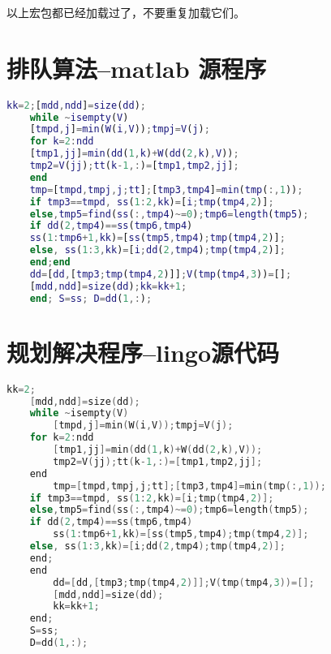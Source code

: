 \begin{appendices}
    以上宏包都已经加载过了，不要重复加载它们。
    
    \section{排队算法--matlab 源程序}
    
    \begin{lstlisting}[language=matlab]
    kk=2;[mdd,ndd]=size(dd);
    while ~isempty(V)
    [tmpd,j]=min(W(i,V));tmpj=V(j);
    for k=2:ndd
    [tmp1,jj]=min(dd(1,k)+W(dd(2,k),V));
    tmp2=V(jj);tt(k-1,:)=[tmp1,tmp2,jj];
    end
    tmp=[tmpd,tmpj,j;tt];[tmp3,tmp4]=min(tmp(:,1));
    if tmp3==tmpd, ss(1:2,kk)=[i;tmp(tmp4,2)];
    else,tmp5=find(ss(:,tmp4)~=0);tmp6=length(tmp5);
    if dd(2,tmp4)==ss(tmp6,tmp4)
    ss(1:tmp6+1,kk)=[ss(tmp5,tmp4);tmp(tmp4,2)];
    else, ss(1:3,kk)=[i;dd(2,tmp4);tmp(tmp4,2)];
    end;end
    dd=[dd,[tmp3;tmp(tmp4,2)]];V(tmp(tmp4,3))=[];
    [mdd,ndd]=size(dd);kk=kk+1;
    end; S=ss; D=dd(1,:);
     \end{lstlisting}
    
     \section{规划解决程序--lingo源代码}
    
    \begin{lstlisting}[language=c]
    kk=2;
    [mdd,ndd]=size(dd);
    while ~isempty(V)
        [tmpd,j]=min(W(i,V));tmpj=V(j);
    for k=2:ndd
        [tmp1,jj]=min(dd(1,k)+W(dd(2,k),V));
        tmp2=V(jj);tt(k-1,:)=[tmp1,tmp2,jj];
    end
        tmp=[tmpd,tmpj,j;tt];[tmp3,tmp4]=min(tmp(:,1));
    if tmp3==tmpd, ss(1:2,kk)=[i;tmp(tmp4,2)];
    else,tmp5=find(ss(:,tmp4)~=0);tmp6=length(tmp5);
    if dd(2,tmp4)==ss(tmp6,tmp4)
        ss(1:tmp6+1,kk)=[ss(tmp5,tmp4);tmp(tmp4,2)];
    else, ss(1:3,kk)=[i;dd(2,tmp4);tmp(tmp4,2)];
    end;
    end
        dd=[dd,[tmp3;tmp(tmp4,2)]];V(tmp(tmp4,3))=[];
        [mdd,ndd]=size(dd);
        kk=kk+1;
    end;
    S=ss;
    D=dd(1,:);
     \end{lstlisting}
    \end{appendices}
    